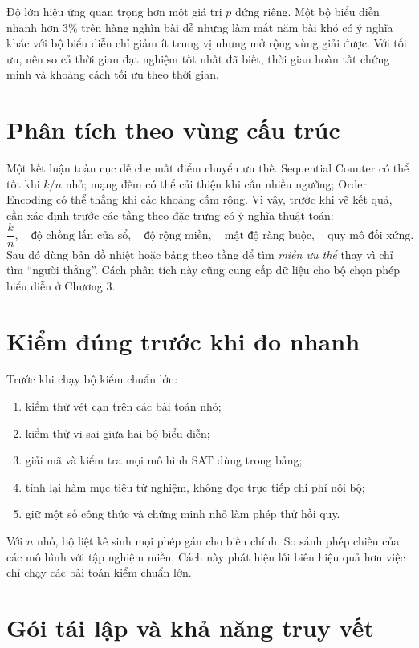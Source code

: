 Độ lớn hiệu ứng quan trọng hơn một giá trị \(p\) đứng riêng. Một bộ biểu diễn nhanh
hơn \(3\%\) trên hàng nghìn bài dễ nhưng làm mất năm bài khó có ý nghĩa khác
với bộ biểu diễn chỉ giảm ít trung vị nhưng mở rộng vùng giải được. Với tối ưu,
nên so cả thời gian đạt nghiệm tốt nhất đã biết, thời gian hoàn tất chứng minh
và khoảng cách tối ưu theo thời gian.

\section{Phân tích theo vùng cấu trúc}

Một kết luận toàn cục dễ che mất điểm chuyển ưu thế. Sequential Counter có thể tốt
khi \(k/n\) nhỏ; mạng đếm có thể cải thiện khi cần nhiều ngưỡng; Order Encoding
có thể thắng khi các khoảng cấm rộng. Vì vậy, trước khi vẽ kết quả, cần xác
định trước các tầng theo đặc trưng có ý nghĩa thuật toán:
\[
  \frac{k}{n},\quad
  \text{độ chồng lấn cửa sổ},\quad
  \text{độ rộng miền},\quad
  \text{mật độ ràng buộc},\quad
  \text{quy mô đối xứng}.
\]
Sau đó dùng bản đồ nhiệt hoặc bảng theo tầng để tìm \emph{miền ưu thế} thay vì
chỉ tìm ``người thắng''. Cách phân tích này cũng cung cấp dữ liệu cho bộ chọn
phép biểu diễn ở Chương 3.

\section{Kiểm đúng trước khi đo nhanh}

Trước khi chạy bộ kiểm chuẩn lớn:
\begin{enumerate}
  \item kiểm thử vét cạn trên các bài toán nhỏ;
  \item kiểm thử vi sai giữa hai bộ biểu diễn;
  \item giải mã và kiểm tra mọi mô hình SAT dùng trong bảng;
  \item tính lại hàm mục tiêu từ nghiệm, không đọc trực tiếp chi phí nội bộ;
  \item giữ một số công thức \CNF và chứng minh nhỏ làm phép thử hồi quy.
\end{enumerate}

Với \(n\) nhỏ, bộ liệt kê sinh mọi phép gán cho biến chính. So sánh phép chiếu
của các mô hình \CNF với tập nghiệm miền. Cách này phát hiện lỗi biên hiệu quả
hơn việc chỉ chạy các bài toán kiểm chuẩn lớn.

\section{Gói tái lập và khả năng truy vết}

